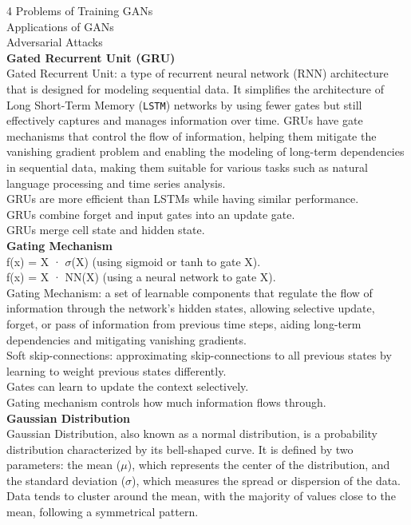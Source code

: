 \documentclass[8pt]{extarticle}
\begin{document}
\begin{multicols}{4}
Problems of Training GANs\\
Applications of GANs\\
Adversarial Attacks\\
\vspace{2pt}\textbf{Gated Recurrent Unit (GRU)}\\
Gated Recurrent Unit: a type of recurrent neural network (RNN) architecture that is designed for modeling sequential data. It simplifies the architecture of Long Short-Term Memory (\texttt{LSTM}) networks by using fewer gates but still effectively captures and manages information over time. GRUs have gate mechanisms that control the flow of information, helping them mitigate the vanishing gradient problem and enabling the modeling of long-term dependencies in sequential data, making them suitable for various tasks such as natural language processing and time series analysis.\\
GRUs are more efficient than LSTMs while having similar performance.\\
GRUs combine forget and input gates into an update gate.\\
GRUs merge cell state and hidden state.\\
\vspace{2pt}\textbf{Gating Mechanism}\\
f(x) = X · $\sigma$(X) (using sigmoid or tanh to gate X).\\
f(x) = X · NN(X) (using a neural network to gate X).\\
Gating Mechanism: a set of learnable components that regulate the flow of information through the network's hidden states, allowing selective update, forget, or pass of information from previous time steps, aiding long-term dependencies and mitigating vanishing gradients.\\
Soft skip-connections: approximating skip-connections to all previous states by learning to weight previous states differently.\\
Gates can learn to update the context selectively.\\
Gating mechanism controls how much information flows through.\\
\vspace{2pt}\textbf{Gaussian Distribution}\\
Gaussian Distribution, also known as a normal distribution, is a probability distribution characterized by its bell-shaped curve. It is defined by two parameters: the mean ($\mu$), which represents the center of the distribution, and the standard deviation ($\sigma$), which measures the spread or dispersion of the data. Data tends to cluster around the mean, with the majority of values close to the mean, following a symmetrical pattern.\\

\end{multicols}
\end{document}
